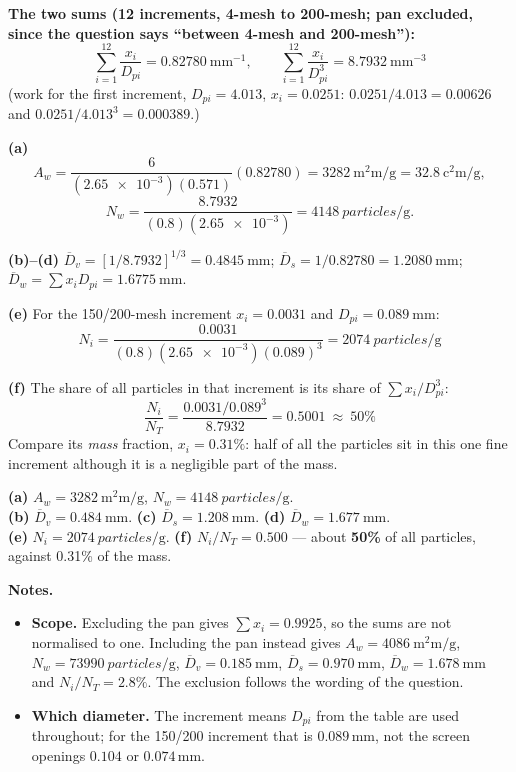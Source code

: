 \documentclass[10pt,a4paper]{article}
\begin{document}
\textbf{The two sums (12 increments, 4-mesh to 200-mesh; pan excluded, since the question says
``between 4-mesh and 200-mesh''):}
\[
\sum_{i=1}^{12}\frac{x_i}{D_{pi}}=0.82780\ \text{mm}^{-1},\qquad
\sum_{i=1}^{12}\frac{x_i}{D_{pi}^3}=8.7932\ \text{mm}^{-3}
\]
(work for the first increment, $D_{pi}=4.013$, $x_i=0.0251$: $0.0251/4.013=0.00626$ and
$0.0251/4.013^3=0.000389$.)

\textbf{(a)}
\[
A_w=\dfrac{6}{(\num{2.65e-3})(0.571)}(0.82780)=\SI{3282}{\square\milli\meter\per\gram}
=\SI{32.8}{\square\centi\meter\per\gram},
\]
\[
N_w=\dfrac{8.7932}{(0.8)(\num{2.65e-3})}=\SI{4148}{particles\per\gram}.
\]

\textbf{(b)--(d)} $\overline{D}_v=[1/8.7932]^{1/3}=\SI{0.4845}{\milli\meter}$;\quad
$\overline{D}_s=1/0.82780=\SI{1.2080}{\milli\meter}$;\quad
$\overline{D}_w=\sum x_iD_{pi}=\SI{1.6775}{\milli\meter}$.

\textbf{(e)} For the 150/200-mesh increment $x_i=0.0031$ and $D_{pi}=\SI{0.089}{\milli\meter}$:
\[
N_i=\frac{0.0031}{(0.8)(\num{2.65e-3})(0.089)^3}=\SI{2074}{particles\per\gram}
\]

\textbf{(f)} The share of all particles in that increment is its share of $\sum x_i/D_{pi}^3$:
\[
\frac{N_i}{N_T}=\frac{0.0031/0.089^3}{8.7932}=0.5001\ \approx\ 50\%
\]
Compare its \emph{mass} fraction, $x_i=0.31\%$: half of all the particles sit in this one fine
increment although it is a negligible part of the mass.

\begin{ansbox}
\textbf{(a)} $A_w=\SI{3282}{\square\milli\meter\per\gram}$, \quad $N_w=\SI{4148}{particles\per\gram}$.\\
\textbf{(b)} $\overline{D}_v=\SI{0.484}{\milli\meter}$.\quad
\textbf{(c)} $\overline{D}_s=\SI{1.208}{\milli\meter}$.\quad
\textbf{(d)} $\overline{D}_w=\SI{1.677}{\milli\meter}$.\\
\textbf{(e)} $N_i=\SI{2074}{particles\per\gram}$.\quad
\textbf{(f)} $N_i/N_T=0.500$ --- about \textbf{50\%} of all particles, against 0.31\% of the mass.
\end{ansbox}

\begin{warnbox}
\textbf{Notes.}
\begin{itemize}
  \item \textbf{Scope.} Excluding the pan gives $\sum x_i=0.9925$, so the sums are not normalised to
        one. Including the pan instead gives $A_w=\SI{4086}{\square\milli\meter\per\gram}$,
        $N_w=\SI{73990}{particles\per\gram}$, $\overline{D}_v=\SI{0.185}{\milli\meter}$,
        $\overline{D}_s=\SI{0.970}{\milli\meter}$, $\overline{D}_w=\SI{1.678}{\milli\meter}$ and
        $N_i/N_T=2.8\%$. The exclusion follows the wording of the question.
  \item \textbf{Which diameter.} The increment means $D_{pi}$ from the table are used throughout; for
        the 150/200 increment that is $0.089$\,mm, not the screen openings $0.104$ or $0.074$\,mm.
\end{itemize}
\end{warnbox}
\end{document}
